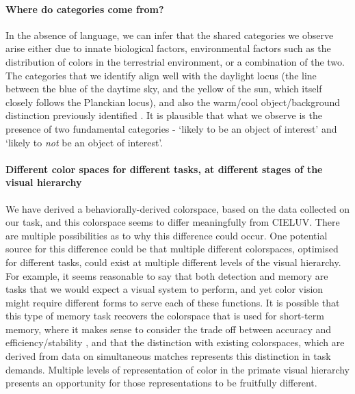 
\paragraph{Where do categories come from?}
In the absence of language, we can infer that the shared categories we observe arise either due to innate biological factors, environmental factors such as the distribution of colors in the terrestrial environment, or a combination of the two.
The categories that we identify align well with the daylight locus (the line between the blue of the daytime sky, and the yellow of the sun, which itself closely follows the Planckian locus), and also the warm/cool object/background distinction previously identified \citep{rosenthal_color_2018}. It is plausible that what we observe is the presence of two fundamental categories - `likely to be an object of interest' and `likely to \emph{not} be an object of interest'. 


\paragraph{Different color spaces for different tasks, at different stages of the visual hierarchy}

We have derived a behaviorally-derived colorspace, based on the data collected on our task, and this colorspace seems to differ meaningfully from CIELUV. %
There are multiple possibilities as to why this difference could occur.
One potential source for this difference could be that multiple different colorspaces, optimised for different tasks, could exist at multiple different levels of the visual hierarchy.
For example, it seems reasonable to say that both detection and memory are tasks that we would expect a visual system to perform, and yet color vision might require different forms to serve each of these functions.
It is possible that this type of memory task recovers the colorspace that is used for short-term memory, where it makes sense to consider the trade off between accuracy and efficiency/stability \citep{panichello_error-correcting_2019}, and that the distinction with existing colorspaces, which are derived from data on simultaneous matches represents this distinction in task demands.
Multiple levels of representation of color in the primate visual hierarchy presents an opportunity for those representations to be fruitfully different.

